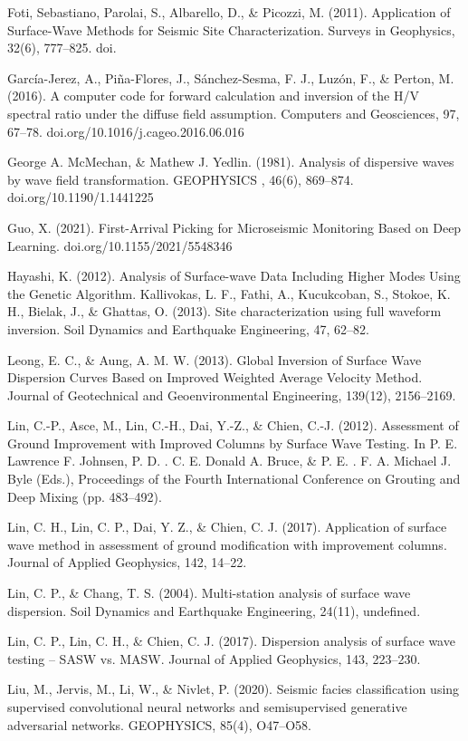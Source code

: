 Foti, Sebastiano, Parolai, S., Albarello, D., \& Picozzi, M. (2011). Application of Surface-Wave Methods for Seismic Site Characterization. Surveys in Geophysics, 32(6), 777–825. doi.

García-Jerez, A., Piña-Flores, J., Sánchez-Sesma, F. J., Luzón, F., \& Perton, M. (2016). A computer code for forward calculation and inversion of the H/V spectral ratio under the diffuse field assumption. Computers and Geosciences, 97, 67–78. doi.org/10.1016/j.cageo.2016.06.016

George A. McMechan, \& Mathew J. Yedlin. (1981). Analysis of dispersive waves by wave field transformation. GEOPHYSICS , 46(6), 869–874. doi.org/10.1190/1.1441225

Guo, X. (2021). First-Arrival Picking for Microseismic Monitoring Based on Deep Learning. doi.org/10.1155/2021/5548346

Hayashi, K. (2012). Analysis of Surface-wave Data Including Higher Modes Using the Genetic Algorithm.
Kallivokas, L. F., Fathi, A., Kucukcoban, S., Stokoe, K. H., Bielak, J., \& Ghattas, O. (2013). Site characterization using full waveform inversion. Soil Dynamics and Earthquake Engineering, 47, 62–82. 

Leong, E. C., \& Aung, A. M. W. (2013). Global Inversion of Surface Wave Dispersion Curves Based on Improved Weighted Average Velocity Method. Journal of Geotechnical and Geoenvironmental Engineering, 139(12), 2156–2169. 

Lin, C.-P., Asce, M., Lin, C.-H., Dai, Y.-Z., \& Chien, C.-J. (2012). Assessment of Ground Improvement with Improved Columns by Surface Wave Testing. In P. E. Lawrence F. Johnsen, P. D. . C. E. Donald A. Bruce, \& P. E. . F. A. Michael J. Byle (Eds.), Proceedings of the Fourth International Conference on Grouting and Deep Mixing (pp. 483–492). 

Lin, C. H., Lin, C. P., Dai, Y. Z., \& Chien, C. J. (2017). Application of surface wave method in assessment of ground modification with improvement columns. Journal of Applied Geophysics, 142, 14–22. 

Lin, C. P., \& Chang, T. S. (2004). Multi-station analysis of surface wave dispersion. Soil Dynamics and Earthquake Engineering, 24(11), undefined. 

Lin, C. P., Lin, C. H., \& Chien, C. J. (2017). Dispersion analysis of surface wave testing – SASW vs. MASW. Journal of Applied Geophysics, 143, 223–230. 

Liu, M., Jervis, M., Li, W., \& Nivlet, P. (2020). Seismic facies classification using supervised convolutional neural networks and semisupervised generative adversarial networks. GEOPHYSICS, 85(4), O47–O58. 

